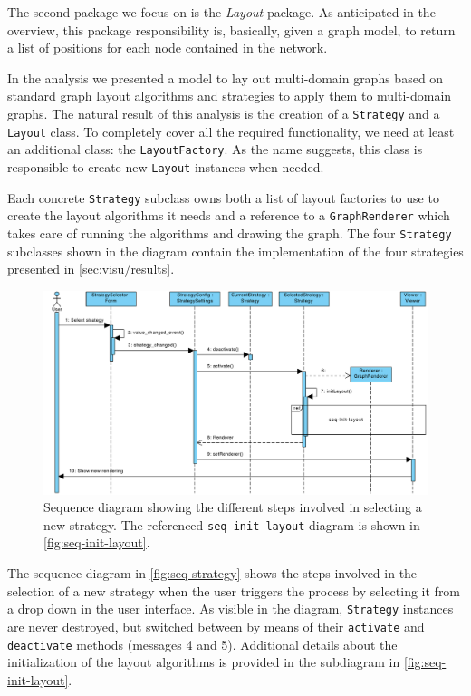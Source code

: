 The second package we focus on is the \emph{Layout} package. As anticipated in the overview, this package responsibility is, basically, given a graph model, to return a list of positions for each node contained in the network.

In the analysis we presented a model to lay out multi-domain graphs based on standard graph layout algorithms and strategies to apply them to multi-domain graphs. The natural result of this analysis is the creation of a \texttt{Strategy} and a \texttt{Layout} class. To completely cover all the required functionality, we need at least an additional class: the \texttt{LayoutFactory}. As the name suggests, this class is responsible to create new \texttt{Layout} instances when needed.

Each concrete \texttt{Strategy} subclass owns both a list of layout factories to use to create the layout algorithms it needs and a reference to a \texttt{GraphRenderer} which takes care of running the algorithms and drawing the graph. The four \texttt{Strategy} subclasses shown in the diagram contain the implementation of the four strategies presented in \vref{sec:visu/results}.

\begin{figure}
  \begin{adjustwidth}{-4.65mm}{-5.7mm}  
    \includegraphics[width=\linewidth]{images/diagrams/seq-strategy}
  \end{adjustwidth}
  \caption[Sequence diagram for the strategy selection process.]{Sequence diagram showing the different steps involved in selecting a new strategy. The referenced \texttt{seq-init-layout} diagram is shown in \vref{fig:seq-init-layout}.}
  \label{fig:seq-strategy}
\end{figure}

The sequence diagram in \vref{fig:seq-strategy} shows the steps involved in the selection of a new strategy when the user triggers the process by selecting it from a drop down in the user interface. As visible in the diagram, \texttt{Strategy} instances are never destroyed, but switched between by means of their \texttt{activate} and \texttt{deactivate} methods (messages 4 and 5). Additional details about the initialization of the layout algorithms is provided in the subdiagram in \vref{fig:seq-init-layout}.

